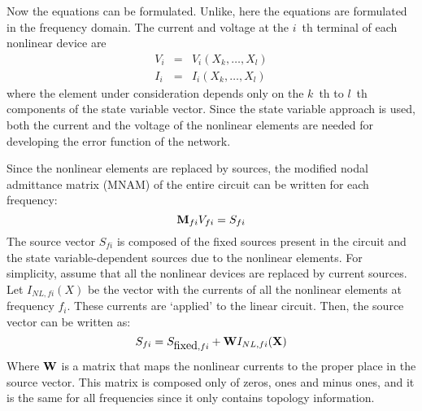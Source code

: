 Now the equations can be formulated.  Unlike\cite{rizzoli:92:1}, here
the equations are formulated in the frequency domain. The current and
voltage at the $i$~th terminal of each nonlinear device are
%
\begin{eqnarray} \label{eq_nldev}
  V_i & = & V_i(X_k, \dots , X_l) \\ 
  I_i & = & I_i(X_k, \dots , X_l)
\end{eqnarray}
%
where the element under consideration depends only on the $k$~th to
$l$~th components of the state variable vector. Since the state
variable approach is used, both the current and the voltage of the
nonlinear elements are needed for developing the error function of the
network.

Since the nonlinear elements are replaced by sources, the modified
nodal admittance matrix (MNAM) of the entire circuit can be written
for each frequency:
%
\begin{equation}
  {\bf M}_{fi}  V_{fi} = S_{fi}
\end{equation}
%
The source vector $S_{fi}$ is composed of the fixed sources present in
the circuit and the state variable-dependent sources due to the
nonlinear elements. For simplicity, assume that all the
nonlinear devices are replaced by current sources. Let $I_{NL,fi}(X)$
be the vector with the currents of all the nonlinear elements at
frequency $f_i$. These currents are `applied' to the linear
circuit. Then, the source vector can be written as:
%
\begin{equation}
  S_{fi} = S_{\mbox{fixed}, fi} + {\bf W}  I_{NL,fi}({\bf X})
\end{equation}
%
Where ${\bf W}$ is a matrix that maps the nonlinear currents to the
proper place in the source vector. This matrix is composed only of
zeros, ones and minus ones, and it is the same for all frequencies
since it only contains topology information.

